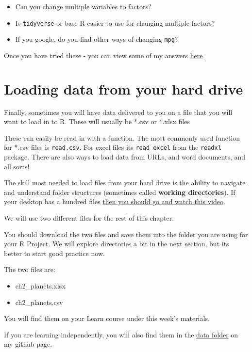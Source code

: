\documentclass[
]{book}
\begin{document}
\begin{itemize}
\item
  Can you change multiple variables to factors?
\item
  Is \texttt{tidyverse} or base R easier to use for changing multiple factors?
\item
  If you google, do you find other ways of changing \texttt{mpg}?
\end{itemize}

Once you have tried these - you can view some of my answers \protect\hyperlink{ans_createdata}{here}

\hypertarget{data_load}{%
\section{Loading data from your hard drive}\label{data_load}}

Finally, sometimes you will have data delivered to you on a file that you will want to load in to R. These will usually be *.csv or *.xlsx files

These can easily be read in with a function. The most commonly used function for *.csv files is \texttt{read.csv}. For excel files its \texttt{read\_excel} from the \texttt{readxl} package. There are also ways to load data from URLs, and word documents, and all sorts!

The skill most needed to load files from your hard drive is the ability to navigate and understand folder structures (sometimes called \textbf{working directories}). If your desktop has a hundred files \href{https://youtu.be/bKjRKZxr-KY}{then you should go and watch this video}.

\begin{hey}
We will use two different files for the rest of this chapter.

You should download the two files and save them into the folder you are
using for your R Project. We will explore directories a bit in the next
section, but its better to start good practice now.

The two files are:

\begin{itemize}
\item
  ch2\_planets.xlsx
\item
  ch2\_planets.csv
\end{itemize}

You will find them on your Learn course under this week's materials.

If you are learning independently, you will also find them in the
\href{https://github.com/jillymackay/RatRDSVS/tree/master/data}{data
folder} on my github page.
\end{hey}
\end{document}
